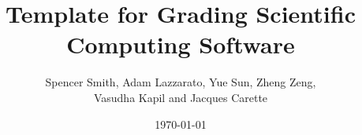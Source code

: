 \documentclass[12pt]{article}
\begin{document}
\title{Template for Grading Scientific Computing Software} 
\author{Spencer Smith, Adam Lazzarato, Yue Sun, Zheng Zeng,\\ Vasudha Kapil and Jacques Carette}
\date{\today}
	
\maketitle

\end{document}
